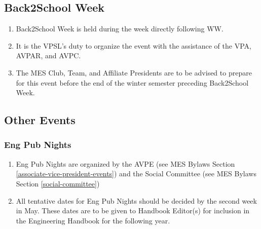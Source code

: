 \subsection{Back2School Week}
\label{back2school-week}
\begin{enumerate}
 \item
  Back2School Week is held during the week directly following WW.
 \item
  It is the VPSL's duty to organize the event with the assistance of the VPA, AVPAR, and AVPC.
 \item
  The MES Club, Team, and Affiliate Presidents are to be advised to prepare for this event before the end of the winter semester preceding Back2School Week.

\end{enumerate}

\subsection{Other Events}
\label{other-events}

\subsubsection{Eng Pub Nights}
\label{eng-pub-nights}
\begin{enumerate}
 \item
  Eng Pub Nights are organized by the AVPE (see MES Bylaws Section \ref{associate-vice-president-events}) and the Social Committee (see MES Bylaws Section \ref{social-committee})
 \item
  All tentative dates for Eng Pub Nights should be decided by the second week in May. These dates are to be given to Handbook Editor(s) for inclusion in the Engineering Handbook for the following year.
\end{enumerate}
